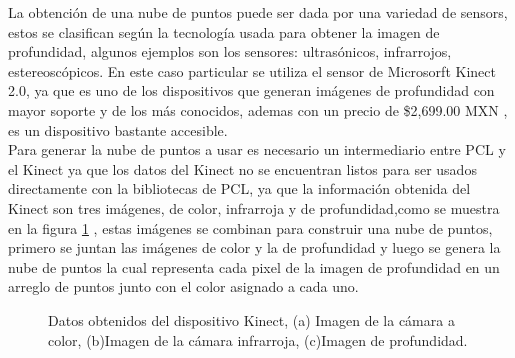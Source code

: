        La obtención de una nube de puntos puede ser dada por una variedad de \glspl{sensor}, estos se clasifican según la tecnología usada para obtener la imagen de profundidad, algunos ejemplos son los sensores: ultrasónicos, infrarrojos, estereoscópicos. En este caso particular se utiliza el sensor de Microsorft Kinect 2.0, ya que es uno de los dispositivos que generan imágenes de profundidad con mayor soporte y de los más conocidos, ademas con un precio de \$2,699.00 MXN \cite{XBOXONEK76:online}, es un dispositivo bastante accesible.\\
        
        Para generar la nube de puntos a usar es necesario un intermediario entre PCL y el Kinect ya que los datos del Kinect no se encuentran listos para ser usados directamente con la bibliotecas de PCL, ya que la información obtenida del Kinect son tres imágenes, de color, infrarroja y de profundidad,como se muestra en la figura \ref{fig:imgKinect} \cite{UsodelKi56:online}, estas imágenes se combinan para construir una nube de puntos, primero se juntan las imágenes de color y la de profundidad y luego se genera la nube de puntos la cual representa cada pixel de la imagen de profundidad en un arreglo de puntos junto con el color asignado a cada uno. \\
          
         \begin{figure}[!htb] 
         	\centering
         
         	\caption[Datos obtenidos del dispositivo Kinect.]{Datos obtenidos del dispositivo Kinect, (a) Imagen de la cámara a color, (b)Imagen de la cámara infrarroja, (c)Imagen de profundidad.} 
         	\label{fig:imgKinect}
         \end{figure}
         
